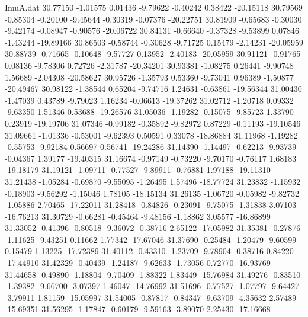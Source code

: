 \begin{filecontents}{ImuA.dat}
  30.77150   -1.01575    0.01436   -9.79622   -0.40242    0.38422  -20.15118
  30.79569   -0.85304   -0.20100   -9.45644   -0.30319   -0.07376  -20.22751
  30.81909   -0.65683   -0.30030   -9.42174   -0.08947   -0.90576  -20.06722
  30.84131   -0.66640   -0.37328   -9.53899    0.07846   -1.43244  -19.89166
  30.86503   -0.58744   -0.30628   -9.71725    0.15479   -2.14231  -20.05959
  30.88739   -0.71665   -0.10648   -9.57727    0.13952   -2.40183  -20.05959
  30.91121   -0.91765    0.08136   -9.78306    0.72726   -2.31787  -20.34201
  30.93381   -1.08275    0.26441   -9.90748    1.56689   -2.04308  -20.58627
  30.95726   -1.35793    0.53360   -9.73041    0.96389   -1.50877  -20.49467
  30.98122   -1.38544    0.65204   -9.74716    1.24631   -0.63861  -19.56344
  31.00430   -1.47039    0.43789   -9.79023    1.16234   -0.06613  -19.37262
  31.02712   -1.20718    0.09332   -9.63350    1.51346    0.53688  -19.26576
  31.05036   -1.19282   -0.15075   -9.85723    1.33790    0.23919  -19.19706
  31.07346   -0.99182   -0.35892   -9.82972    0.87229   -0.11193  -19.10546
  31.09661   -1.01336   -0.53001   -9.62393    0.50591    0.33078  -18.86884
  31.11968   -1.19282   -0.55753   -9.92184    0.56697    0.56741  -19.24286
  31.14390   -1.14497   -0.62213   -9.93739   -0.04367    1.39177  -19.40315
  31.16674   -0.97149   -0.73220   -9.70170   -0.76117    1.68183  -19.18179
  31.19121   -1.09711   -0.77527   -9.89911   -0.76881    1.97188  -19.11310
  31.21438   -1.05284   -0.69870   -9.55095   -1.26495    1.57496  -18.77724
  31.23832   -1.15932   -0.18903   -9.56292   -1.15046    1.78105  -18.15134
  31.26135   -1.06720   -0.05982   -9.82732   -1.05886    2.70465  -17.22011
  31.28418   -0.84826   -0.23091   -9.75075   -1.31838    3.07103  -16.76213
  31.30729   -0.66281   -0.45464   -9.48156   -1.18862    3.05577  -16.86899
  31.33052   -0.41396   -0.80518   -9.36072   -0.38716    2.65122  -17.05982
  31.35381   -0.27876   -1.11625   -9.43251    0.11662    1.77342  -17.67046
  31.37690   -0.25484   -1.20479   -9.60599    0.15479    1.13225  -17.72389
  31.40112   -0.43310   -1.23709   -9.78904   -0.38716    0.84220  -17.44910
  31.42329   -0.40439   -1.24187   -9.62633   -1.73056    0.72770  -16.93769
  31.44658   -0.49890   -1.18804   -9.70409   -1.88322    1.83449  -15.76984
  31.49276   -0.83510   -1.39382   -9.66700   -3.07397    1.46047  -14.76992
  31.51696   -0.77527   -1.07797   -9.64427   -3.79911    1.81159  -15.05997
  31.54005   -0.87817   -0.84347   -9.63709   -4.35632    2.57489  -15.69351
  31.56295   -1.17847   -0.60179   -9.59163   -3.89070    2.25430  -17.16668

\end{filecontents}
